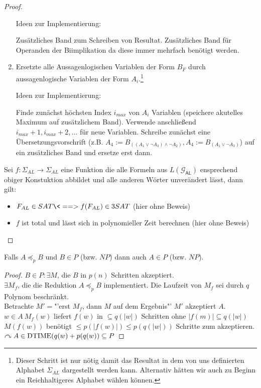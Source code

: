 \begin{proof}
\begin{enumerate}
	Ideen zur Implementierung:
	
	Zusätzliches Band zum Schreiben von Resultat.
    Zusätzliches Band für Operanden der Biimplikation da diese immer mehrfach benötigt werden.
  
\item Ersetzte alle Aussagenlogischen Variablen der Form $B_F$ durch aussagenlogische Variablen der Form $A_i$.\footnote{
Dieser Schritt ist nur nötig damit das Resultat in dem von uns definierten Alphabet $\Sigma_{AL}$ dargestellt werden kann.
Alternativ hätten wir auch zu Beginn ein Reichhaltigeres Alphabet wählen können.
}

	Ideen zur Implementierung:
	
    Finde zunächst höchsten Index $i_{max}$ von $A_i$ Variablen (speichere akutelles Maximum auf zusätzlichem Band).
    Verwende anschließend $i_{max}+1, i_{max}+2, \ldots$ für neue Variablen.
    Schreibe zunächst eine Übersetzungsvorschrift (z.B. $A_4:=B_{((A_1\lor \neg A_3)\land \neg A_2)}, A_4:=B_{(A_1\lor \neg A_3)}$) auf ein zusätzliches Band und ersetze erst dann.

\end{enumerate}

Sei $f:\Sigma_{AL}\rightarrow\Sigma_{AL}$ eine Funktion die alle Formeln aus $L(\mathcal{G}_\mathsf{AL})$ ensprechend obiger Konstuktion abbildet und alle anderen Wörter unverändert lässt, dann gilt:
\begin{itemize}
 \item $F_{AL}\in SAT \<==> f(F_{AL})\in 3SAT$ (hier ohne Beweis)
 \item $f$ ist total und lässt sich in polynomieller Zeit berechnen (hier ohne Beweis)
\end{itemize}



\end{proof}



\begin{lemma}\label{lem:A<B + BinP => AinP}
	Falls $A\preceq_p B$ und $B\in P$ (bzw. $NP$) dann auch $A\in P$ (bzw. $NP$).
\end{lemma}
\begin{proof}
	$B\in P: \exists M$, die $B$ in $p(n)$ Schritten akzeptiert.\\
	$\exists M_f$, die die Reduktion $A\preceq_p B$ implementiert. Die Laufzeit von $M_f$ sei durch $q$ Polynom beschränkt.\\
	Betrachte $M'=$"'erst $M_f$, dann $M$ auf dem Ergebnis"'
	$M'$ akzeptiert $A$.\\
	$w\in A\ M_f(w)$ liefert $f(w)$ in $\subseteq q(|w|)$ Schritten ohne $|f(m)|\subseteq q(|w|)$\\
	$M(f(w))$ benötigt $\leq p(|f(w)|)\leq p(q(|w|))$ Schritte zum akzeptieren.\\
	$\curvearrowright A\in \operatorname{DTIME}(q(w)+p(q(w))\subseteq P$
\end{proof}


